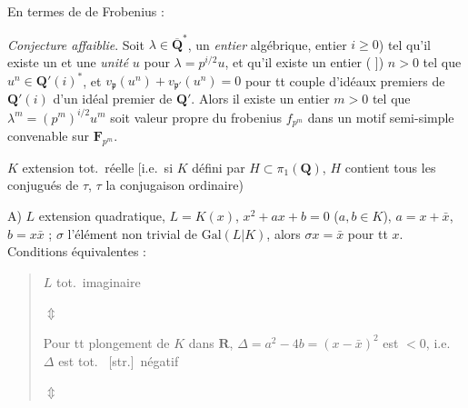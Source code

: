 \documentclass[11pt,a4paper]{article}
\begin{document}
En termes de \ill{} \ill{} de Frobenius :


\emph{Conjecture affaiblie}. Soit $\lambda \in \overline{\mathbf{Q}}^{*}$,
 un \emph{entier} algébrique,
 \ill{} entier $i \geqslant 0$) \ill{}
tel qu'il existe un \ill{} et une \emph{unité} $u$ \ill{} pour
$\lambda = p^{i/2} u$,  \ill{} et qu'il existe un
entier (\ill{} ]) $n > 0$ tel que
$u^{n} \in \mathbf{Q}'(i)^{*}$, et
$v_{\mathfrak{p}}(u^{n}) + v_{\mathfrak{p}'}(u^{n}) = 0$ pour tt couple
d'idéaux premiers de $\mathbf{Q}'(i)$  d'un idéal
premier de $\mathbf{Q}'$. Alors il existe un entier $m > 0$ tel que
$\lambda^{m} = (p^{m})^{i/2} u^{m}$ soit  valeur propre du
frobenius $f_{p^{m}}$ dans un motif semi-simple 
convenable sur $\mathbf{F}_{p^{m}}$.

$K$ extension tot.\ réelle [i.e.\ si $K$ défini par
$H \subset \pi_{1}(\mathbf{Q})$, $H$ contient tous les conjugués de $\tau$,
$\tau$ la conjugaison ordinaire)

A) $L$ extension quadratique, $L = K(x)$, $x^{2} + ax + b = 0$
($a, b \in K$), $a = x + \bar{x}$, $b = x\bar{x}$ ; $\sigma$ l'élément non
trivial de $\mathrm{Gal}(L|K)$, alors $\sigma x = \bar{x}$ pour tt $x$.
Conditions équivalentes :
\begin{quote}
$L$ tot.\ imaginaire

$\Updownarrow$

Pour tt plongement de $K$ dans $\mathbf{R}$,
$\Delta = a^{2} - 4b = (x - \bar{x})^{2}$ est $< 0$, i.e.\ $\Delta$ est
tot.\  [str.]\ négatif

$\Updownarrow$ 
\end{quote}
\end{document}
